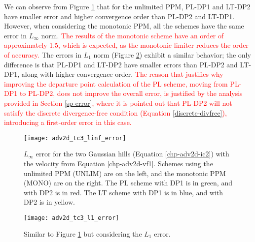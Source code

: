 We can observe from Figure \ref{chp-adv2d-sec-exp-adv2-error-linf} that for the unlimited PPM, PL-DP1 and LT-DP2 have smaller
error and higher convergence order than PL-DP2 and LT-DP1.
However, when considering the monotonic PPM, all the schemes have the same error in $L_{\infty}$ norm.
\textcolor{red}{The results of the monotonic scheme have an order of approximately 1.5, which is expected, as the monotonic limiter reduces the order of accuracy.}
The errors in $L_{1}$ norm (Figure \ref{chp-adv2d-sec-exp-adv2-error-l1}) exhibit a similar behavior; the only difference is 
that PL-DP1 and LT-DP2 have smaller errors than PL-DP2 and LT-DP1, along with higher convergence order.
\textcolor{red}{
The reason that justifies why improving the departure point calculation of the PL scheme,
moving from PL-DP1 to PL-DP2, does not improve the overall error, is justified by the analysis provided in Section \ref{sp-error},
where it is pointed out that PL-DP2 will not satisfy the discrete divergence-free condition 
(Equation \eqref{discrete-divfree}), introducing a first-order error in this case.}

\begin{figure}[!htb]
\centering
\texttt{[image: adv2d\_tc3\_linf\_error]}
\caption{$L_{\infty}$ error for the two Gaussian hills (Equation \ref{chp-adv2d-ic2})
with the velocity from Equation \eqref{chp-adv2d-vf1}.
Schemes using the unlimited PPM (UNLIM) are on the left, and the monotonic PPM (MONO) are on the right.
The PL scheme with DP1 is in green, and with DP2 is in red. 
The LT scheme with DP1 is in blue, and with DP2 is in yellow.
\label{chp-adv2d-sec-exp-adv2-error-linf}}
\end{figure}
\begin{figure}[!htb]
\centering
\texttt{[image: adv2d\_tc3\_l1\_error]}
\caption{Similar to Figure \ref{chp-adv2d-sec-exp-adv2-error-linf} but considering the $L_1$ error.
\label{chp-adv2d-sec-exp-adv2-error-l1}}
\end{figure}

\newpage

